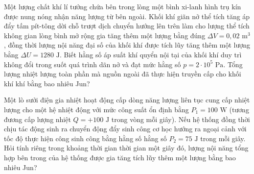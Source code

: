 \begin{ex}	Một lượng chất khí lí tưởng chứa bên trong lòng một bình xi-lanh hình trụ kín được nung nóng nhận năng lượng từ bên ngoài. Khối khí giãn nở thể tích tăng áp đẩy tấm pít-tông dời chỗ trượt dịch chuyển hướng lên trên làm cho lượng thể tích không gian lòng bình mở rộng gia tăng thêm một lượng bằng đúng $\Delta V = 0,02\text{ m}^3$, đồng thời lượng nội năng đại số của khối khí được tích lũy tăng thêm một lượng bằng $\Delta U = 1280\text{ J}$. Biết hằng số áp suất khí quyển nội tại của khối khí duy trì không đổi trong suốt quá trình dãn nở và đạt mức hằng số $p = 2 \cdot 10^{5}\text{ Pa}$. Tổng lượng nhiệt lượng toàn phần mà nguồn ngoài đã thực hiện truyền cấp cho khối khí khí bằng bao nhiêu Jun?

	\par{}
\end{ex}

\begin{ex}	Một lò sưởi điện gia nhiệt hoạt động cấp dòng năng lượng liên tục cung cấp nhiệt lượng cho một hệ nhiệt động với mức công suất ổn định bằng $P_1 = 100\text{ W}$ (tương đương cấp lượng nhiệt $Q = +100\text{ J}$ trong vòng mỗi giây). Nếu hệ thống đồng thời chịu tác động sinh ra chuyển động đẩy sinh công cơ học hướng ra ngoại cảnh với tốc độ thực hiện công sinh công bằng hằng số hằng số $P_2 = 75\text{ J}$ trong mỗi giây. Hỏi tính riêng trong khoảng thời gian thời gian một giây đó, lượng nội năng tổng hợp bên trong của hệ thống được gia tăng tích lũy thêm một lượng bằng bao nhiêu Jun?

	\par{}
\end{ex}

